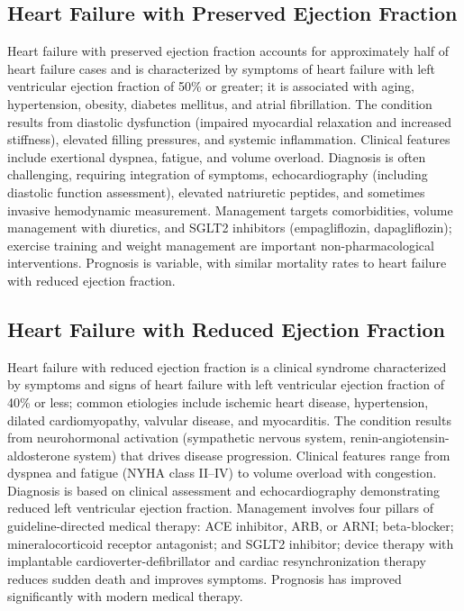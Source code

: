 \subsection{Heart Failure with Preserved Ejection Fraction}
\label{sec:Heart Failure with Preserved Ejection Fraction}
Heart failure with preserved ejection fraction accounts for approximately half of heart failure cases and is characterized by symptoms of heart failure with left ventricular ejection fraction of 50\% or greater; it is associated with aging, hypertension, obesity, diabetes mellitus, and atrial fibrillation. The condition results from diastolic dysfunction (impaired myocardial relaxation and increased stiffness), elevated filling pressures, and systemic inflammation. Clinical features include exertional dyspnea, fatigue, and volume overload. Diagnosis is often challenging, requiring integration of symptoms, echocardiography (including diastolic function assessment), elevated natriuretic peptides, and sometimes invasive hemodynamic measurement. Management targets comorbidities, volume management with diuretics, and SGLT2 inhibitors (empagliflozin, dapagliflozin); exercise training and weight management are important non-pharmacological interventions. Prognosis is variable, with similar mortality rates to heart failure with reduced ejection fraction.

\subsection{Heart Failure with Reduced Ejection Fraction}
\label{sec:Heart Failure with Reduced Ejection Fraction}
Heart failure with reduced ejection fraction is a clinical syndrome characterized by symptoms and signs of heart failure with left ventricular ejection fraction of 40\% or less; common etiologies include ischemic heart disease, hypertension, dilated cardiomyopathy, valvular disease, and myocarditis. The condition results from neurohormonal activation (sympathetic nervous system, renin-angiotensin-aldosterone system) that drives disease progression. Clinical features range from dyspnea and fatigue (NYHA class II--IV) to volume overload with congestion. Diagnosis is based on clinical assessment and echocardiography demonstrating reduced left ventricular ejection fraction. Management involves four pillars of guideline-directed medical therapy: ACE inhibitor, ARB, or ARNI; beta-blocker; mineralocorticoid receptor antagonist; and SGLT2 inhibitor; device therapy with implantable cardioverter-defibrillator and cardiac resynchronization therapy reduces sudden death and improves symptoms. Prognosis has improved significantly with modern medical therapy.

